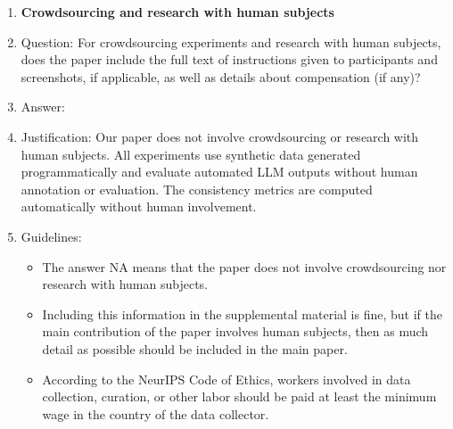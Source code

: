 \documentclass{article}
\begin{document}
\begin{enumerate}
\item {\bf Crowdsourcing and research with human subjects}
    \item[] Question: For crowdsourcing experiments and research with human subjects, does the paper include the full text of instructions given to participants and screenshots, if applicable, as well as details about compensation (if any)? 
    \item[] Answer: \answerNA{} %
    \item[] Justification: \justification Our paper does not involve crowdsourcing or research with human subjects. All experiments use synthetic data generated programmatically and evaluate automated LLM outputs without human annotation or evaluation. The consistency metrics are computed automatically without human involvement.{}
    \item[] Guidelines:
    \begin{itemize}
        \item The answer NA means that the paper does not involve crowdsourcing nor research with human subjects.
        \item Including this information in the supplemental material is fine, but if the main contribution of the paper involves human subjects, then as much detail as possible should be included in the main paper. 
        \item According to the NeurIPS Code of Ethics, workers involved in data collection, curation, or other labor should be paid at least the minimum wage in the country of the data collector. 
    \end{itemize}


\end{enumerate}
\end{document}
